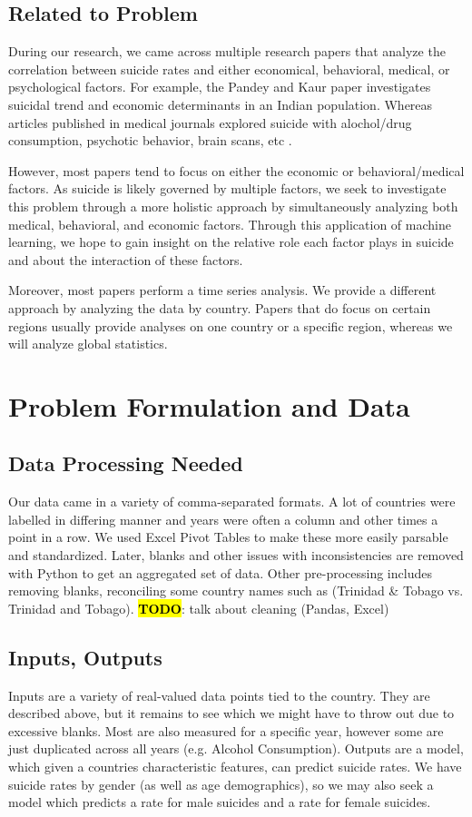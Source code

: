 \documentclass{article}
\newcommand{\TODO}{\textcolor{red}{\textbf{\hl{TODO}}}}
\begin{document}
\begin{multicols}{2}
\subsection{Related to Problem} 

During our research, we came across multiple research papers that analyze the correlation between suicide rates and either economical, behavioral, medical, or psychological factors. For example, the Pandey and Kaur paper investigates suicidal trend and economic determinants in an Indian population. Whereas articles published in medical journals explored suicide with alochol/drug consumption, psychotic behavior, brain scans, etc . 

However, most papers tend to focus on either the economic or behavioral/medical factors. As suicide is likely governed by multiple factors, we seek to investigate this problem through a more holistic approach by simultaneously analyzing both medical, behavioral, and economic factors. Through this application of machine learning, we hope to gain insight on the relative role each factor plays in suicide and about the interaction of these factors. 

Moreover, most papers perform a time series analysis. We provide a different approach by analyzing the data by country. Papers that do focus on certain regions usually provide analyses on one country or a specific region, whereas we will analyze global statistics. 


\section{Problem Formulation and Data} 
\subsection{Data Processing Needed} Our data came in a variety of comma-separated formats. A lot of countries were labelled in differing manner and years were often a column and other times a point in a row. We used Excel Pivot Tables to make these more easily parsable and standardized. Later, blanks and other issues with inconsistencies are removed with Python to get an aggregated set of data. Other pre-processing includes removing blanks, reconciling some country names such as (Trinidad \& Tobago vs. Trinidad and Tobago).
\TODO : talk about cleaning (Pandas, Excel)
\subsection{Inputs, Outputs} Inputs are a variety of real-valued data points tied to the country. They are described above, but it remains to see which we might have to throw out due to excessive blanks. Most are also measured for a specific year, however some are just duplicated across all years (e.g. Alcohol Consumption). Outputs are a model, which given a countries characteristic features, can predict suicide rates. We have suicide rates by gender (as well as age demographics), so we may also seek a model which predicts a rate for male suicides and a rate for female suicides.

\end{multicols}
\end{document}
